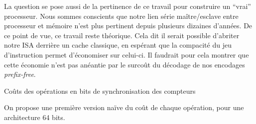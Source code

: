 \documentclass[architecture]{compas2018}
\begin{document}
La question se pose aussi de la pertinence de ce travail pour construire un ``vrai'' processeur.
Nous sommes conscients que notre  lien série maître/esclave entre processeur et mémoire n'est plus pertinent depuis plusieurs dizaines d'années.
De ce point de vue, ce travail reste théorique.
Cela dit il serait possible d'abriter notre ISA derrière un cache classique, en espérant que la compacité du jeu d'instruction permet d'économiser sur celui-ci.
Il faudrait pour cela montrer que cette économie n'est pas anéantie par le surcoût du décodage de nos encodages \emph{prefix-free}. 





\begin{table}[!h]
  \caption{Coûts des opérations en bits de synchronisation des compteurs}
  \label{tab:costs}


  
  \iffalse
  On propose une première version naïve du coût de chaque opération, pour une architecture 64 bits.
  

\end{table}
\end{document}
